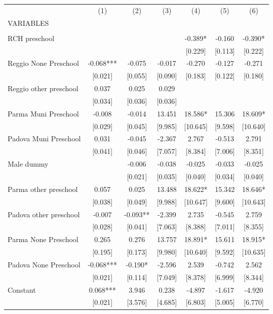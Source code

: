 \begin{tabular}{lcccccc} \hline
 & (1) & (2) & (3) & (4) & (5) & (6) \\
VARIABLES &  &  &  &  &  &  \\ \hline
 &  &  &  &  &  &  \\
RCH preschool &  &  &  & -0.389* & -0.160 & -0.390* \\
 &  &  &  & [0.229] & [0.113] & [0.222] \\
Reggio None Preschool & -0.068*** & -0.075 & -0.017 & -0.270 & -0.127 & -0.271 \\
 & [0.021] & [0.055] & [0.090] & [0.183] & [0.122] & [0.180] \\
Reggio other preschool & 0.037 & 0.025 & 0.029 &  &  &  \\
 & [0.034] & [0.036] & [0.036] &  &  &  \\
Parma Muni Preschool & -0.008 & -0.014 & 13.451 & 18.586* & 15.306 & 18.609* \\
 & [0.029] & [0.045] & [9.985] & [10.645] & [9.598] & [10.640] \\
Padova Muni Preschool & 0.031 & -0.045 & -2.367 & 2.767 & -0.513 & 2.791 \\
 & [0.041] & [0.046] & [7.057] & [8.384] & [7.006] & [8.351] \\
Male dummy &  & -0.006 & -0.038 & -0.025 & -0.033 & -0.025 \\
 &  & [0.021] & [0.035] & [0.040] & [0.034] & [0.040] \\
Parma other preschool & 0.057 & 0.025 & 13.488 & 18.622* & 15.342 & 18.646* \\
 & [0.038] & [0.049] & [9.988] & [10.647] & [9.600] & [10.643] \\
Padova other preschool & -0.007 & -0.093** & -2.399 & 2.735 & -0.545 & 2.759 \\
 & [0.028] & [0.041] & [7.063] & [8.388] & [7.011] & [8.355] \\
Parma None Preschool & 0.265 & 0.276 & 13.757 & 18.891* & 15.611 & 18.915* \\
 & [0.195] & [0.173] & [9.980] & [10.640] & [9.592] & [10.635] \\
Padova None Preschool & -0.068*** & -0.190* & -2.596 & 2.539 & -0.742 & 2.562 \\
 & [0.021] & [0.114] & [7.049] & [8.378] & [6.999] & [8.344] \\
Constant & 0.068*** & 3.946 & 0.238 & -4.897 & -1.617 & -4.920 \\
 & [0.021] & [3.576] & [4.685] & [6.803] & [5.005] & [6.770] \\

\end{tabular}
